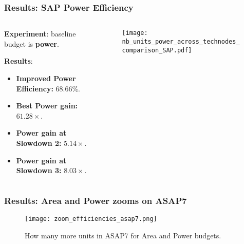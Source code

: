 \begin{frame}
    \frametitle{Results: SAP Power Efficiency}

    \scriptsize

    \begin{columns}
    \begin{column}{0.45\columnwidth}

	    \textbf{Experiment}: baseline budget is \textbf{power}.
	\vspace{3mm}

	    \textbf{Results}:
	\begin{itemize}
                \item \textbf{Improved Power Efficiency:} $68.66\%$.
                \item \textbf{Best Power gain:} $61.28\times$.
                \item \textbf{Power gain at Slowdown 2:} $5.14\times$.
                \item \textbf{Power gain at Slowdown 3:} $8.03\times$.
            \end{itemize}
	\end{column}

        \begin{column}{0.55\textwidth}
	\begin{figure}[H]
            \centering
		\vspace{1mm}
            \texttt{[image: nb\_units\_power\_across\_technodes\_comparison\_SAP.pdf]}
	\end{figure}
        \end{column}
    \end{columns}

\end{frame}

\begin{frame}
    \frametitle{Results: Area and Power zooms on ASAP7}

    \tiny
	\begin{figure}[H]
            \centering
            \texttt{[image: zoom\_efficiencies\_asap7.png]}
		\vspace{-2mm}
		\caption{How many more units in ASAP7 for Area and Power budgets.}
	\end{figure}

    \normalsize

\end{frame}

